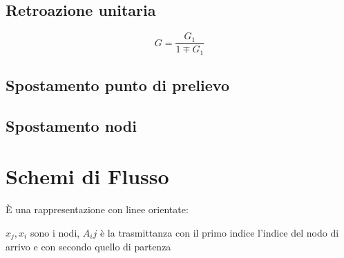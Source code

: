 \subsection{Retroazione unitaria}
\begin{center}
	
\end{center}
\[
G = \frac{G_1}{1\mp G_1}
\]

\subsection{Spostamento punto di prelievo}
\begin{center}
	
\end{center}

\subsection{Spostamento nodi}
\begin{center}
	
\end{center}

\section{Schemi di Flusso}

È una rappresentazione con linee orientate:

\begin{center}
	
\end{center}

$ x_j, x_i $ sono i nodi, $ A_ij $ è la trasmittanza %
con il primo indice l'indice del nodo di arrivo e con secondo quello di partenza

